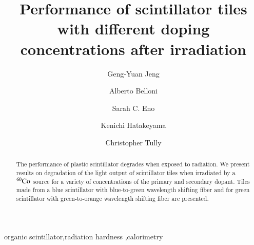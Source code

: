 \documentclass[review]{elsarticle}
\begin{document}
\begin{frontmatter}

\title{Performance of scintillator tiles with different doping concentrations after irradiation }


\author[umd]{Geng-Yuan Jeng}
\author[umd]{Alberto Belloni}
\author[umd]{Sarah C. Eno}
\author[baylor]{Kenichi Hatakeyama}
\author[princeton]{Christopher Tully}



\address[umd]{Dept. Physics, U. Maryland, College Park MD 30742 USA}
\address[eljen]{Eljen Technology, 1300 W. Broadway, Sweetwater, Tx 79556 USA}
\address[fnal]{Fermi National Accelerator Laboratory, Batavia, IL, USA}
\address[baylor]{Baylor University, Waco, Texas, USA}
\address[princeton]{Princeton University, Princeton, NJ, USA}

\begin{abstract}
The performance of plastic scintillator degrades when exposed to radiation. We present results on degradation of the light output of scintillator
tiles when irradiated by a $\rm{^{60}Co}$ source for a variety of concentrations of the primary and secondary dopant.  Tiles made from a blue scintillator with blue-to-green wavelength shifting fiber and for green scintillator with green-to-orange wavelength shifting fiber are presented.
\end{abstract}

\begin{keyword}
organic scintillator\sep radiation hardness \sep calorimetry
\end{keyword}

\end{frontmatter}

\linenumbers
\end{document}
